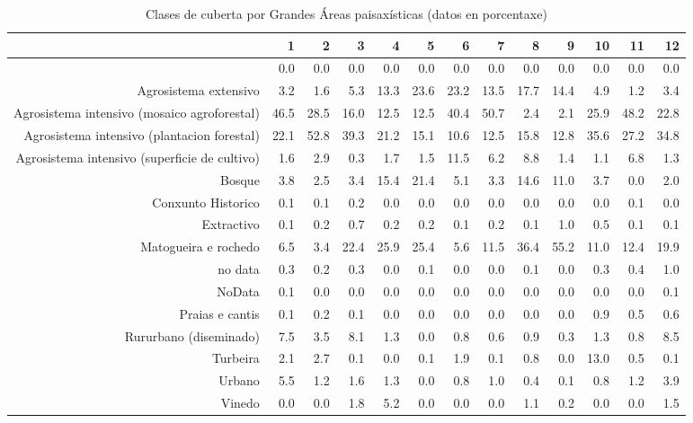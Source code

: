 \begin{table}[p]
\centering
\caption{Clases de cuberta por Grandes Áreas paisaxísticas (datos en porcentaxe)} 
\label{xtaboa2p}
\begin{tabular}{rrrrrrrrrrrrr}
  \hline
 & 1 & 2 & 3 & 4 & 5 & 6 & 7 & 8 & 9 & 10 & 11 & 12 \\ 
  \hline
 & 0.0 & 0.0 & 0.0 & 0.0 & 0.0 & 0.0 & 0.0 & 0.0 & 0.0 & 0.0 & 0.0 & 0.0 \\ 
  Agrosistema extensivo & 3.2 & 1.6 & 5.3 & 13.3 & 23.6 & 23.2 & 13.5 & 17.7 & 14.4 & 4.9 & 1.2 & 3.4 \\ 
  Agrosistema intensivo (mosaico agroforestal) & 46.5 & 28.5 & 16.0 & 12.5 & 12.5 & 40.4 & 50.7 & 2.4 & 2.1 & 25.9 & 48.2 & 22.8 \\ 
  Agrosistema intensivo (plantacion forestal) & 22.1 & 52.8 & 39.3 & 21.2 & 15.1 & 10.6 & 12.5 & 15.8 & 12.8 & 35.6 & 27.2 & 34.8 \\ 
  Agrosistema intensivo (superficie de cultivo) & 1.6 & 2.9 & 0.3 & 1.7 & 1.5 & 11.5 & 6.2 & 8.8 & 1.4 & 1.1 & 6.8 & 1.3 \\ 
  Bosque & 3.8 & 2.5 & 3.4 & 15.4 & 21.4 & 5.1 & 3.3 & 14.6 & 11.0 & 3.7 & 0.0 & 2.0 \\ 
  Conxunto Historico & 0.1 & 0.1 & 0.2 & 0.0 & 0.0 & 0.0 & 0.0 & 0.0 & 0.0 & 0.0 & 0.1 & 0.0 \\ 
  Extractivo & 0.1 & 0.2 & 0.7 & 0.2 & 0.2 & 0.1 & 0.2 & 0.1 & 1.0 & 0.5 & 0.1 & 0.1 \\ 
  Matogueira e rochedo & 6.5 & 3.4 & 22.4 & 25.9 & 25.4 & 5.6 & 11.5 & 36.4 & 55.2 & 11.0 & 12.4 & 19.9 \\ 
  no data & 0.3 & 0.2 & 0.3 & 0.0 & 0.1 & 0.0 & 0.0 & 0.1 & 0.0 & 0.3 & 0.4 & 1.0 \\ 
  NoData & 0.1 & 0.0 & 0.0 & 0.0 & 0.0 & 0.0 & 0.0 & 0.0 & 0.0 & 0.0 & 0.0 & 0.1 \\ 
  Praias e cantis & 0.1 & 0.2 & 0.1 & 0.0 & 0.0 & 0.0 & 0.0 & 0.0 & 0.0 & 0.9 & 0.5 & 0.6 \\ 
  Rururbano (diseminado) & 7.5 & 3.5 & 8.1 & 1.3 & 0.0 & 0.8 & 0.6 & 0.9 & 0.3 & 1.3 & 0.8 & 8.5 \\ 
  Turbeira & 2.1 & 2.7 & 0.1 & 0.0 & 0.1 & 1.9 & 0.1 & 0.8 & 0.0 & 13.0 & 0.5 & 0.1 \\ 
  Urbano & 5.5 & 1.2 & 1.6 & 1.3 & 0.0 & 0.8 & 1.0 & 0.4 & 0.1 & 0.8 & 1.2 & 3.9 \\ 
  Vinedo & 0.0 & 0.0 & 1.8 & 5.2 & 0.0 & 0.0 & 0.0 & 1.1 & 0.2 & 0.0 & 0.0 & 1.5 \\ 
   \hline
\end{tabular}
\end{table}
